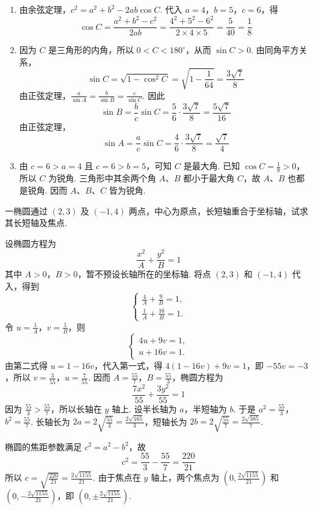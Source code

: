 \begin{solution}
\begin{enumerate}
    \item 由余弦定理，\(c^{2}=a^{2}+b^{2}-2ab\cos C\). 代入 \(a=4\)，\(b=5\)，\(c=6\)，得
    \[
    \cos C=\frac{a^{2}+b^{2}-c^{2}}{2ab}
    =\frac{4^{2}+5^{2}-6^{2}}{2\times4\times5}
    =\frac{5}{40}=\frac{1}{8}
    \]

    \item 因为 \(C\) 是三角形的内角，所以 \(0<C<180^{\circ}\)，从而 \(\sin C>0\). 由同角平方关系，
    \[
    \sin C=\sqrt{1-\cos^{2}C}
    =\sqrt{1-\frac{1}{64}}
    =\frac{3\sqrt{7}}{8}
    \]
    由正弦定理，\(\frac{a}{\sin A}=\frac{b}{\sin B}=\frac{c}{\sin C}\). 因此
    \[
    \sin B=\frac{b}{c}\sin C=\frac{5}{6}\cdot\frac{3\sqrt{7}}{8}=\frac{5\sqrt{7}}{16}
    \]
    由正弦定理，
    \[
    \sin A=\frac{a}{c}\sin C=\frac{4}{6}\cdot\frac{3\sqrt{7}}{8}=\frac{\sqrt{7}}{4}
    \]

    \item 由 \(c=6>a=4\) 且 \(c=6>b=5\)，可知 \(C\) 是最大角. 已知 \(\cos C=\frac18>0\)，所以 \(C\) 为锐角. 三角形中其余两个角 \(A\)、\(B\) 都小于最大角 \(C\)，故 \(A\)、\(B\) 也都是锐角. 因而 \(A\)、\(B\)、\(C\) 皆为锐角.
\end{enumerate}
\end{solution}

\begin{problem}
一椭圆通过 \(\left( 2,3 \right)\) 及 \(\left( -1,4 \right)\) 两点，中心为原点，长短轴重合于坐标轴，试求其长短轴及焦点.
\end{problem}

\begin{solution}
设椭圆方程为
\[
\frac{x^{2}}{A}+\frac{y^{2}}{B}=1
\]
其中 \(A>0\)，\(B>0\)，暂不预设长轴所在的坐标轴. 将点 \((2,3)\) 和 \((-1,4)\) 代入，得到
\[
    \begin{cases}
    \frac{4}{A}+\frac{9}{B}=1,\\
    \frac{1}{A}+\frac{16}{B}=1.
    \end{cases}
\]
令 \(u=\frac{1}{A}\)，\(v=\frac{1}{B}\)，则
\[
\begin{cases}
4u+9v=1,\\
u+16v=1.
\end{cases}
\]
由第二式得 \(u=1-16v\)，代入第一式，得 \(4(1-16v)+9v=1\)，即 \(-55v=-3\)，所以 \(v=\frac{3}{55}\)，\(u=\frac{7}{55}\). 因而 \(A=\frac{55}{7}\)，\(B=\frac{55}{3}\)，椭圆方程为
\[
\frac{7x^{2}}{55}+\frac{3y^{2}}{55}=1
\]
因为 \(\frac{55}{3}>\frac{55}{7}\)，所以长轴在 \(y\) 轴上. 设半长轴为 \(a\)，半短轴为 \(b\). 于是 \(a^{2}=\frac{55}{3}\)，\(b^{2}=\frac{55}{7}\). 长轴长为 \(2a=2\sqrt{\frac{55}{3}}=\frac{2\sqrt{165}}{3}\)，短轴长为 \(2b=2\sqrt{\frac{55}{7}}=\frac{2\sqrt{385}}{7}\).

椭圆的焦距参数满足 \(c^{2}=a^{2}-b^{2}\)，故
\[
c^{2}=\frac{55}{3}-\frac{55}{7}=\frac{220}{21}
\]
所以 \(c=\sqrt{\frac{220}{21}}=\frac{2\sqrt{1155}}{21}\).
由于焦点在 \(y\) 轴上，两个焦点为 \(\left(0,\frac{2\sqrt{1155}}{21}\right)\) 和 \(\left(0,-\frac{2\sqrt{1155}}{21}\right)\)，即 \(\left(0,\pm\frac{2\sqrt{1155}}{21}\right)\).
\end{solution}
